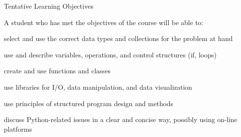 \documentclass{beamer}%
\begin{document}
\begin{frame}{Tentative Learning Objectives}


A student who has met the objectives of the course will be able to:
\begin{itemize}
{\footnotesize
\item select and use the correct data types and collections for the problem at hand
\item use and describe variables, operations, and control structures (if, loops)
\item create and use functions and classes %
\item use libraries for I/O, data manipulation, and data visualization
\item use principles of structured program design and methods
\item discuss Python-related issues in a clear and concise way, possibly using on-line platforms
}
\end{itemize}

\end{frame}
\end{document}
